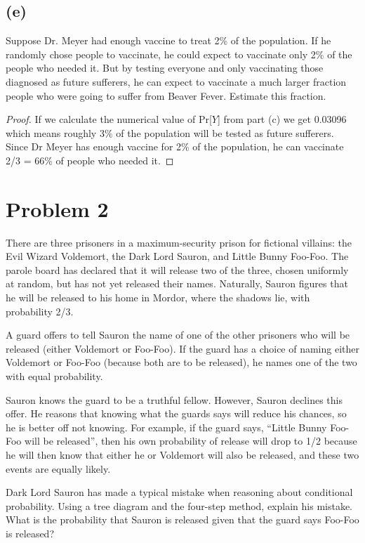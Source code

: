 \documentclass[14pt]{extarticle}
\begin{document}
\subsection{(e)}
Suppose Dr. Meyer had enough vaccine to treat 2\% of the population. If he randomly chose people to vaccinate, he could expect to vaccinate only 2\% of the people who needed it. But by testing everyone and only vaccinating those diagnosed as future sufferers, he can expect to vaccinate a much larger fraction people who were going to suffer from Beaver Fever. Estimate this fraction.
\begin{proof}
If we calculate the numerical value of Pr[$Y$] from part (c) we get 0.03096 which means roughly 3\% of the population will be tested as future sufferers. Since Dr Meyer has enough vaccine for 2\% of the population, he can vaccinate 2/3 = 66\% of people who needed it.
\end{proof}

\section{Problem 2}
There are three prisoners in a maximum-security prison for fictional villains: the Evil Wizard Voldemort, the Dark Lord Sauron, and Little Bunny Foo-Foo. The parole board has declared that it will release two of the three, chosen uniformly at random, but has not yet released their names. Naturally, Sauron figures that he will be released to his home in Mordor, where the shadows lie, with probability 2/3.

A guard offers to tell Sauron the name of one of the other prisoners who will be released (either Voldemort or Foo-Foo). If the guard has a choice of naming either Voldemort or Foo-Foo (because both are to be released), he names one of the two with equal probability.

Sauron knows the guard to be a truthful fellow. However, Sauron declines this offer. He reasons that knowing what the guards says will reduce his chances, so he is better off not knowing. For example, if the guard says, “Little Bunny Foo-Foo will be released”, then his own probability of release will drop to 1/2 because he will then know that either he or Voldemort will also be released, and these two events are equally likely.

Dark Lord Sauron has made a typical mistake when reasoning about conditional probability. Using a tree diagram and the four-step method, explain his mistake. What is the probability that Sauron is released given that the guard says Foo-Foo is released?
\end{document}
